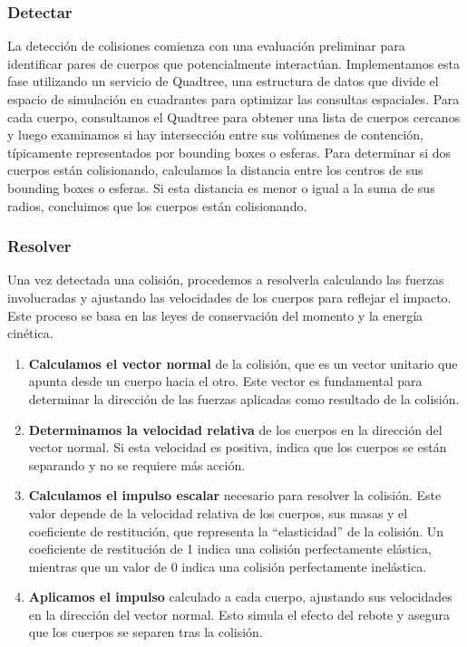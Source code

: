 \subsubsection{Detectar}
La detección de colisiones comienza con una evaluación preliminar para identificar pares de cuerpos que potencialmente interactúan. Implementamos esta fase utilizando un servicio de Quadtree, una estructura de datos que divide el espacio de simulación en cuadrantes para optimizar las consultas espaciales. Para cada cuerpo, consultamos el Quadtree para obtener una lista de cuerpos cercanos y luego examinamos si hay intersección entre sus volúmenes de contención, típicamente representados por bounding boxes o esferas.
Para determinar si dos cuerpos están colisionando, calculamos la distancia entre los centros de sus bounding boxes o esferas. Si esta distancia es menor o igual a la suma de sus radios, concluimos que los cuerpos están colisionando.
\subsubsection{Resolver}
Una vez detectada una colisión, procedemos a resolverla calculando las fuerzas involucradas y ajustando las velocidades de los cuerpos para reflejar el impacto. Este proceso se basa en las leyes de conservación del momento y la energía cinética.
\begin{enumerate}
    \item \textbf{Calculamos el vector normal} de la colisión, que es un vector unitario que apunta desde un cuerpo hacia el otro. Este vector es fundamental para determinar la dirección de las fuerzas aplicadas como resultado de la colisión.
    \item \textbf{Determinamos la velocidad relativa} de los cuerpos en la dirección del vector normal. Si esta velocidad es positiva, indica que los cuerpos se están separando y no se requiere más acción.
    \item \textbf{Calculamos el impulso escalar} necesario para resolver la colisión. Este valor depende de la velocidad relativa de los cuerpos, sus masas y el coeficiente de restitución, que representa la ``elasticidad'' de la colisión. Un coeficiente de restitución de 1 indica una colisión perfectamente elástica, mientras que un valor de 0 indica una colisión perfectamente inelástica.
    \item \textbf{Aplicamos el impulso} calculado a cada cuerpo, ajustando sus velocidades en la dirección del vector normal. Esto simula el efecto del rebote y asegura que los cuerpos se separen tras la colisión.
\end{enumerate}
